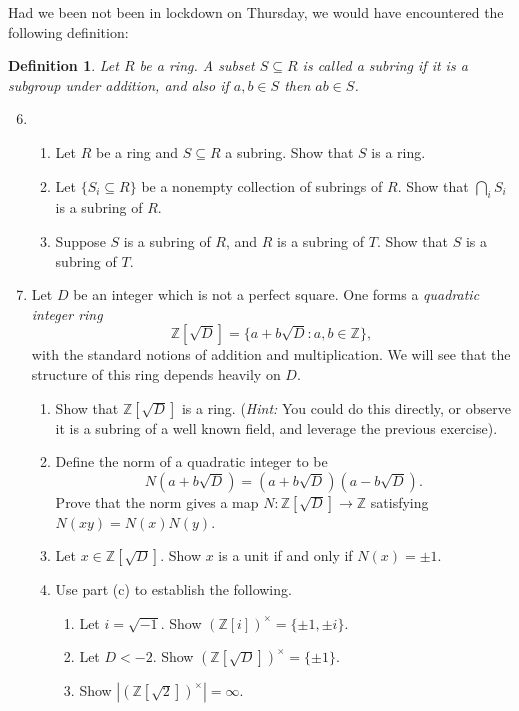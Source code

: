 \documentclass[11pt]{article}
\newtheorem{definition}[theorem]{Definition}
\newcommand{\bZ}{\mathbb{Z}}
\begin{document}
Had we been not been in lockdown on Thursday, we would have encountered the following definition:
\begin{definition}
Let $R$ be a ring.  A subset $S\subseteq R$ is called a \textit{subring} if it is a subgroup under addition, and also if $a,b\in S$ then $ab\in S$.
\end{definition}
\begin{enumerate}
\setcounter{enumi}{5}
\item{
\begin{enumerate}
	\item{Let $R$ be a ring and $S\subseteq R$ a subring.  Show that $S$ is a ring.}
      \item{
    Let $\{S_i\subseteq R\}$ be a nonempty collection of subrings of $R$.  Show that $\bigcap_i S_i$ is a subring of $R$.
    }
    \item{
    Suppose $S$ is a subring of $R$, and $R$ is a subring of $T$.  Show that $S$ is a subring of $T$.
    }
  \end{enumerate}
  }
  \item{
  Let $D$ be an integer which is not a perfect square.  One forms a \textit{quadratic integer ring}
  \[\bZ[\sqrt{D}] = \{a+b\sqrt{D}:a,b\in\bZ\},\]
  with the standard notions of addition and multiplication.  We will see that the structure of this ring depends heavily on $D$.
  \begin{enumerate}
  \item{Show that $\bZ[\sqrt{D}]$ is a ring.  (\textit{Hint:} You could do this directly, or observe it is a subring of a well known field, and leverage the previous exercise).}
  \item{Define the norm of a quadratic integer to be
  \[N(a+b\sqrt{D}) = (a+b\sqrt{D})(a-b\sqrt{D}).\]
  Prove that the norm gives a map $N:\bZ[\sqrt{D}]\to\bZ$ satisfying $N(xy) = N(x)N(y)$.
    }
    \item{Let $x\in\bZ[\sqrt{D}]$.  Show $x$ is a unit if and only if $N(x) = \pm1$.}
    \item{Use part (c) to establish the following.
    \begin{enumerate}
    	\item Let $i=\sqrt{-1}$.  Show $(\bZ[i])^\times = \{\pm1,\pm i\}$.
	\item Let $D<-2$.  Show $(\bZ[\sqrt{D}])^\times = \{\pm1\}$.
	\item Show $|(\bZ[\sqrt{2}])^\times|=\infty.$
	\end{enumerate}
	}
\end{enumerate}
}
\end{enumerate}
\end{document}
